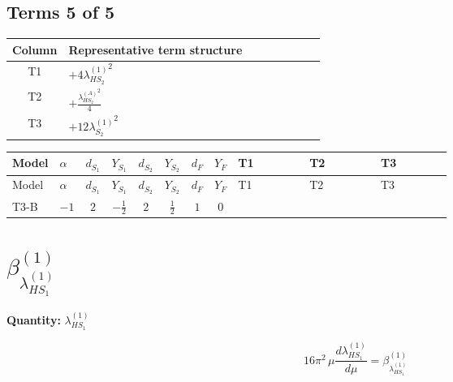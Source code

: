 \documentclass[8pt]{article}
\begin{document}
\begin{landscape}
\subsection*{Terms 5 of 5}
\begin{center}
\begin{tabular}{@{}c >{\raggedright\arraybackslash}p{0.82\linewidth}@{}}
\toprule
Column & Representative term structure \\
\midrule
T1 & \(\displaystyle +4 {\lambda_{HS_2}^{(1)}}^2\) \\
\midrule
T2 & \(\displaystyle +\frac{{\lambda_{HS_2}^{(A)}}^2}{4}\) \\
\midrule
T3 & \(\displaystyle +12 {\lambda_{S_2}^{(1)}}^2\) \\
\midrule
\bottomrule
\end{tabular}
\end{center}
\smallskip
\tiny
\begin{longtable}{@{}llcccccc >{\raggedright\arraybackslash}p{0.21\linewidth} >{\raggedright\arraybackslash}p{0.21\linewidth} >{\raggedright\arraybackslash}p{0.21\linewidth}@{}}
\toprule
Model & $\alpha$ & $d_{S_1}$ & $Y_{S_1}$ & $d_{S_2}$ & $Y_{S_2}$ & $d_F$ & $Y_F$ & T1 & T2 & T3 \\
\midrule
\endfirsthead
\toprule
Model & $\alpha$ & $d_{S_1}$ & $Y_{S_1}$ & $d_{S_2}$ & $Y_{S_2}$ & $d_F$ & $Y_F$ & T1 & T2 & T3 \\
\midrule
\endhead
T3-B & $-1$ & $2$ & $-\frac{1}{2}$ & $2$ & $\frac{1}{2}$ & $1$ & $0$ & \scriptsize\adjustbox{max width=\linewidth}{$\begin{gathered} +4 {\lambda_{HS_2}^{(1)}}^2\end{gathered}$} & \scriptsize\adjustbox{max width=\linewidth}{$\begin{gathered} +\frac{{\lambda_{HS_2}^{(A)}}^2}{4}\end{gathered}$} & \scriptsize\adjustbox{max width=\linewidth}{$\begin{gathered} +12 {\lambda_{S_2}^{(1)}}^2\end{gathered}$} \\
\midrule
\bottomrule
\end{longtable}
\clearpage
\section*{$\beta_{\lambda_{HS_1}^{(1)}}^{(1)}$}
\noindent\textbf{Quantity: }$\lambda_{HS_1}^{(1)}$\par\smallskip
\[16\pi^2\,\mu\frac{d \lambda_{HS_1}^{(1)}}{d\mu}=\beta_{\lambda_{HS_1}^{(1)}}^{(1)}\]

\end{landscape}
\end{document}
